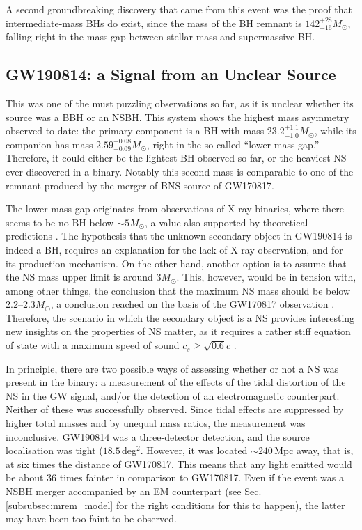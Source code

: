 \documentclass[binding=0.6cm, LaM]{sapthesis}
\begin{document}
	A second groundbreaking discovery that came from this event 
	was the proof that intermediate-mass BHs do exist,
	since the mass of the BH remnant is $142^{+28}_{-16}M_\odot$, 
	falling right in the mass gap between stellar-mass and supermassive BH.

\subsection{GW190814: a Signal from an Unclear Source}
\label{subsec:GW190814}
	This was one of the must puzzling observations so far, as it is unclear
	whether its source was a BBH or an NSBH.
	This system shows the highest mass asymmetry observed to date:
	the primary component is a BH with mass $23.2^{+1.1}_{-1.0}M_\odot$, 
	while its companion has mass $2.59^{+0.08}_{-0.09}M_\odot$, right in the so called
	``lower mass gap.''  Therefore, it could either be the lightest BH
	observed so far, or the heaviest NS ever discovered in a binary.
        Notably this second mass is comparable to one of the remnant 
	produced by the merger of BNS source of GW170817.

	The lower mass gap originates from observations of X-ray binaries, 
	where there seems to be no BH below $\sim 5M_\odot$,
	a value also supported by theoretical predictions \cite{124}.
	The hypothesis that the unknown secondary object in GW190814 is indeed a BH, 
	requires an explanation for the lack of X-ray observation, 
	and for its production mechanism.
	On the other hand, another option is to assume that the NS mass upper limit is around $3M_\odot$.
	This, however, would be in tension with, among other things, the conclusion that 
        the maximum NS mass should be below $2.2$--$2.3M_\odot$, 
	a conclusion reached on the basis of the GW170817 observation \cite{122,123}.
	Therefore, the scenario in which the secondary object is a NS provides interesting new insights on the properties of NS matter, 
	as it requires a rather stiff equation of state with a maximum speed of sound $c_s \geq \sqrt{0.6}c$ \cite{121}.

	In principle, there are two possible ways of assessing whether or not a NS was present in the binary: 
	a measurement of the effects of the tidal distortion of the NS 
	in the GW signal, and/or the detection of an electromagnetic counterpart.
        Neither of these was successfully observed.
	Since tidal effects are suppressed by higher total masses 	
	and by unequal mass ratios, the measurement was inconclusive. 
	GW190814 was a three-detector detection, and the source localisation was tight ($18.5\,$deg$^2$.
	However, it was located $\sim 240\,$Mpc away, that is,
	at six times the distance of GW170817.
	This means that any light emitted would be about 36 times fainter in comparison to GW170817.
	Even if the event was a NSBH merger accompanied by an EM counterpart
	(see Sec.\,\ref{subsubsec:mrem_model} for the right conditions for this to happen), 
	the latter may have been too faint to be observed.
\end{document}
